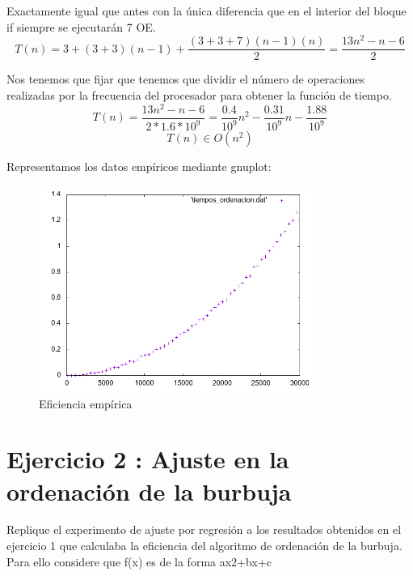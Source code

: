 \documentclass{article}
\begin{document}
			Exactamente igual que antes con la \'unica diferencia que en el interior del bloque if siempre se ejecutar\'an 7 OE.
		\begin{equation}
			T(n) = 3 + (3+3)(n-1) + \frac{(3+3+7)(n-1)(n)}{2} = \frac{13n^2 -n -6}{2}
		\end{equation}

	Nos tenemos que fijar que tenemos que dividir el n\'umero de operaciones realizadas por la frecuencia del procesador para obtener la funci\'on de tiempo.
		\begin{equation}
			T(n) = \frac{13n^2 -n -6}{2*1.6*10^9} = \frac{0.4}{10^9}n^2 - \frac{0.31}{10^9}n - \frac{1.88}{10^9} 
		\end{equation}
		\begin{equation}
						T(n) \in O(n^2)
		\end{equation}

	Representamos los datos emp\'iricos mediante gnuplot:
	\begin{figure}[H]
  		\caption{Eficiencia emp\'irica}
  		\centering
  		\includegraphics[width=0.8\textwidth]{ejer1/grafica.png}
	\end{figure}


\clearpage
\section{Ejercicio 2 : Ajuste en la ordenación de la burbuja}
Replique el experimento de ajuste por regresión a los resultados obtenidos en el ejercicio 1 que calculaba la eficiencia del algoritmo de ordenación de la burbuja. Para ello considere que f(x) es de la forma ax2+bx+c
\vspace{10mm}
\end{document}

